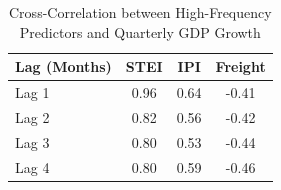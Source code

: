 \begin{table}[h]
\centering
\begin{tabular}{lccc}
\hline
\textbf{Lag (Months)} & \textbf{STEI} & \textbf{IPI} & \textbf{Freight} \\
\hline
Lag 1 & 0.96 & 0.64 & -0.41 \\
Lag 2 & 0.82 & 0.56 & -0.42 \\
Lag 3 & 0.80 & 0.53 & -0.44 \\
Lag 4 & 0.80 & 0.59 & -0.46 \\
\hline
\end{tabular}
\caption{Cross-Correlation between High-Frequency Predictors and Quarterly GDP Growth}
\label{tab:hf_correlations}
\end{table}